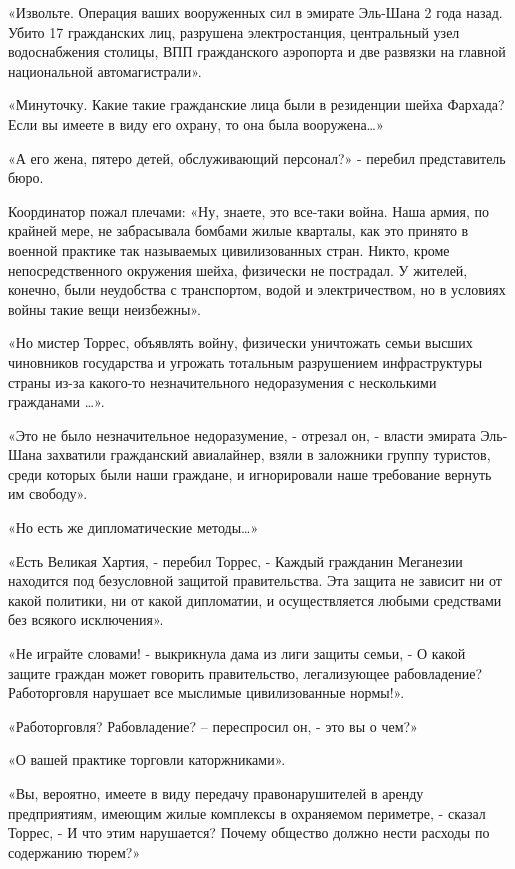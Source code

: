 \documentclass[10pt,final]{book}
\begin{document}
«Извольте. Операция ваших вооруженных сил в эмирате Эль-Шана 2 года назад. Убито 17 гражданских лиц, разрушена электростанция, центральный узел водоснабжения столицы, ВПП гражданского аэропорта и две развязки на главной национальной автомагистрали».

«Минуточку. Какие такие гражданские лица были в резиденции шейха Фархада? Если вы имеете в виду его охрану, то она была вооружена\ldots{}»

«А его жена, пятеро детей, обслуживающий персонал?» - перебил представитель бюро.

Координатор пожал плечами: «Ну, знаете, это все-таки война. Наша армия, по крайней мере, не забрасывала бомбами жилые кварталы, как это принято в военной практике так называемых цивилизованных стран. Никто, кроме непосредственного окружения шейха, физически не пострадал. У жителей, конечно, были неудобства с транспортом, водой и электричеством, но в условиях войны такие вещи неизбежны».

«Но мистер Торрес, объявлять войну, физически уничтожать семьи высших чиновников государства и угрожать тотальным разрушением инфраструктуры страны из-за какого-то незначительного недоразумения с несколькими гражданами \ldots{}».

«Это не было незначительное недоразумение, - отрезал он, - власти эмирата Эль-Шана захватили гражданский авиалайнер, взяли в заложники группу туристов, среди которых были наши граждане, и игнорировали наше требование вернуть им свободу».

«Но есть же дипломатические методы\ldots{}»

«Есть Великая Хартия, - перебил Торрес, - Каждый гражданин Меганезии находится под безусловной защитой правительства. Эта защита не зависит ни от какой политики, ни от какой дипломатии, и осуществляется любыми средствами без всякого исключения».

«Не играйте словами! - выкрикнула дама из лиги защиты семьи, - О какой защите граждан может говорить правительство, легализующее рабовладение? Работорговля нарушает все мыслимые цивилизованные нормы!».

«Работорговля? Рабовладение? -- переспросил он, - это вы о чем?»

«О вашей практике торговли каторжниками».

«Вы, вероятно, имеете в виду передачу правонарушителей в аренду предприятиям, имеющим жилые комплексы в охраняемом периметре, - сказал Торрес, - И что этим нарушается? Почему общество должно нести расходы по содержанию тюрем?»
\end{document}

